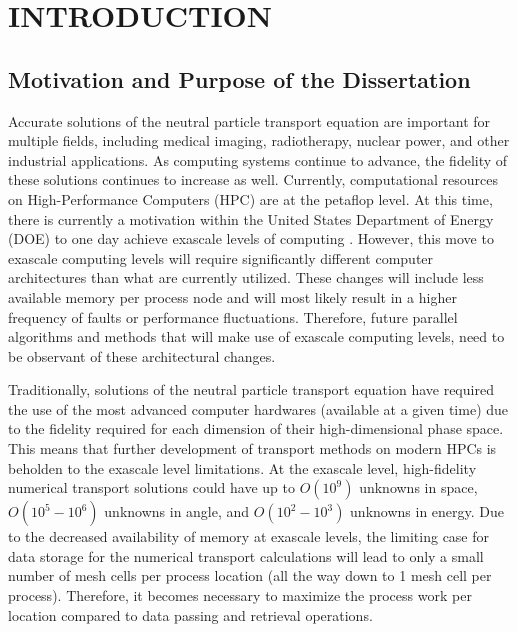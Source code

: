 %
%
%
\chapter{\uppercase {Introduction}}
\label{sec::Intro}

\section{Motivation and Purpose of the Dissertation}
\label{sec::Intro_Purpose}

Accurate solutions of the neutral particle transport equation are important for multiple fields, including medical imaging, radiotherapy, nuclear power, and other industrial applications. As computing systems continue to advance, the fidelity of these solutions continues to increase as well. Currently, computational resources on High-Performance Computers (HPC) are at the petaflop level. At this time, there is currently a motivation within the United States Department of Energy (DOE) to one day achieve exascale levels of computing \cite{bergman2008exascale}. However, this move to exascale computing levels will require significantly different computer architectures than what are currently utilized. These changes will include less available memory per process node and will most likely result in a higher frequency of faults or performance fluctuations. Therefore, future parallel algorithms and methods that will make use of exascale computing levels, need to be observant of these architectural changes.

Traditionally, solutions of the neutral particle transport equation have required the use of the most advanced computer hardwares (available at a given time) due to the fidelity required for each dimension of their high-dimensional phase space. This means that further development of transport methods on modern HPCs is beholden to the exascale level limitations. At the exascale level, high-fidelity numerical transport solutions could have up to $O(10^9)$ unknowns in space, $O(10^5-10^6)$ unknowns in angle, and $O(10^2-10^3)$ unknowns in energy. Due to the decreased availability of memory at exascale levels, the limiting case for data storage for the numerical transport calculations will lead to only a small number of mesh cells per process location (all the way down to 1 mesh cell per process). Therefore, it becomes necessary to maximize the process work per location compared to data passing and retrieval operations. 

